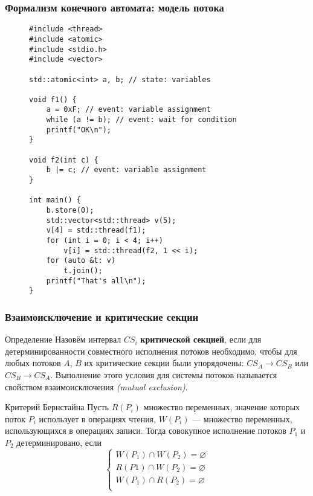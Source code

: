 \documentclass[aspectratio=169, pdf, 8pt, unicode]{beamer}
\begin{document}
\begin{frame}[fragile]
\frametitle{Формализм конечного автомата: модель потока}
\begin{figure}[H]
\centering
\begin{minipage}{0.8\textwidth}
\small
\begin{verbatim}
#include <thread>
#include <atomic>
#include <stdio.h>
#include <vector>

std::atomic<int> a, b; // state: variables

void f1() {
    a = 0xF; // event: variable assignment
    while (a != b); // event: wait for condition
    printf("OK\n");
}

void f2(int c) {
    b |= c; // event: variable assignment
}

int main() {
    b.store(0);
    std::vector<std::thread> v(5);
    v[4] = std::thread(f1);
    for (int i = 0; i < 4; i++)
        v[i] = std::thread(f2, 1 << i);
    for (auto &t: v)
        t.join();
    printf("That's all\n");
}
\end{verbatim}
\end{minipage}
\end{figure}
\end{frame}

\begin{frame}
\frametitle{Взаимоисключение и критические секции}
\begin{block}{Определение}
   Назовём интервал $CS_i$ \textbf{критической секцией}, если для детерминированности совместного исполнения потоков необходимо,
   чтобы для любых потоков $A$, $B$ их критические секции были упорядочены: $CS_A \to CS_B$ или $CS_B \to CS_A$.
   Выполнение этого условия для системы потоков называется свойством взаимоисключения \textit{(mutual exclusion)}.
\end{block}
\begin{block}{Критерий Бернстайна}
	Пусть $R(P_i)$ множество переменных, значение которых поток $P_i$ использует в операциях чтения, $W(P_i)$ ---
	множество переменных, использующихся в операциях записи. Тогда совокупное исполнение потоков $P_1$ и $P_2$ детерминировано, если
	\begin{equation}
	\left\{
	\begin{aligned}
		W(P_1) \cap W(P_2) = \varnothing \\
		R(P1)  \cap W(P_2) = \varnothing \\
		W(P_1) \cap R(P_2) = \varnothing \\
	\end{aligned}
	\right.
   \end{equation}
\end{block}
\end{frame}
\end{document}
